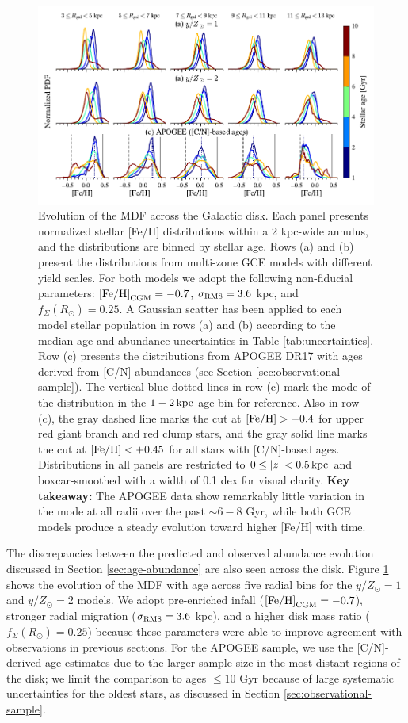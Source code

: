 \documentclass[twocolumn,twocolappendix,linenumbers]{aastex631}
\newcommand{\mathFeH}{{\rm [Fe/H]}}
\newcommand{\yZ}[1]{$y/Z_\odot=#1$}
\begin{document}
\begin{figure}
    \centering
    \includegraphics[width=0.9\linewidth]{figures/mdf_evolution.pdf}
    \caption{Evolution of the MDF across the Galactic disk. Each panel presents normalized stellar [Fe/H] distributions within a {2 kpc}-wide annulus, and the distributions are binned by stellar age. Rows (a) and (b) present the distributions from multi-zone GCE models with different yield scales. For both models we adopt the following non-fiducial parameters: $\mathFeH_{\rm CGM}=-0.7$, $\sigma_{\rm RM8}=3.6$ kpc, and $f_\Sigma(R_\odot)=0.25$. A Gaussian scatter has been applied to each model stellar population in rows (a) and (b) according to the median age and abundance uncertainties in Table \ref{tab:uncertainties}. Row (c) presents the distributions from APOGEE DR17 with ages derived from [C/N] abundances (see Section \ref{sec:observational-sample}). The vertical blue dotted lines in row (c) mark the mode of the distribution in the $1-2\,{\rm kpc}$ age bin for reference. Also in row (c), the gray dashed line marks the cut at $\mathFeH>-0.4$ for upper red giant branch and red clump stars, and the gray solid line marks the cut at $\mathFeH<+0.45$ for all stars with [C/N]-based ages. Distributions in all panels are restricted to $0\leq|z|<0.5\,{\rm kpc}$ and boxcar-smoothed with a width of {0.1 dex} for visual clarity. {\bf Key takeaway:} The APOGEE data show remarkably little variation in the mode at all radii over the past $\sim6-8$ Gyr, while both GCE models produce a steady evolution toward higher [Fe/H] with time.}
    \label{fig:mdf-evolution}
\end{figure}

The discrepancies between the predicted and observed abundance evolution discussed in Section \ref{sec:age-abundance} are also seen across the disk. Figure \ref{fig:mdf-evolution} shows the evolution of the MDF with age across five radial bins for the \yZ{1} and \yZ{2} models. We adopt pre-enriched infall ($\mathFeH_{\rm CGM}=-0.7$), stronger radial migration ($\sigma_{\rm RM8}=3.6$ kpc), and a higher disk mass ratio ($f_\Sigma(R_\odot)=0.25$) because these parameters were able to improve agreement with observations in previous sections. For the APOGEE sample, we use the [C/N]-derived age estimates due to the larger sample size in the most distant regions of the disk; we limit the comparison to ages $\leq10$ Gyr because of large systematic uncertainties for the oldest stars, as discussed in Section \ref{sec:observational-sample}. 
\end{document}
